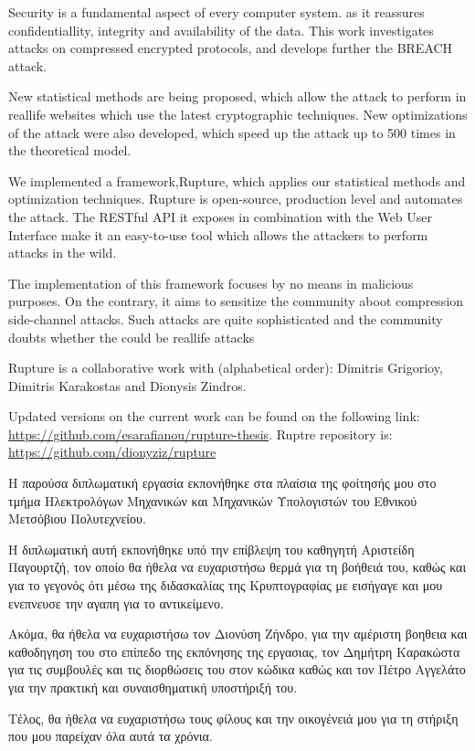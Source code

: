 \begin{abstracten}

Security is a fundamental aspect of every computer system. as it reassures
 confidentiallity, integrity and availability of the data. This work investigates
attacks on compressed encrypted protocols, and develops further the BREACH attack.

New statistical methods are being proposed, which allow the attack to perform in reallife websites
which use the latest cryptographic techniques. New optimizations of the attack were also developed, which speed
up the attack up to 500 times in the theoretical model.

We implemented a framework,Rupture, which applies our statistical methods and 
optimization techniques. Rupture is open-source, production level and automates the attack.
The RESTful API it exposes in combination with the Web User Interface make it an easy-to-use tool 
which allows the attackers to perform attacks in the wild.

The implementation of this framework focuses by no means in malicious purposes. On the contrary,
it aims to sensitize the community aboot compression side-channel attacks. Such attacks are quite 
sophisticated and the community doubts whether the could be reallife attacks

Rupture is a collaborative work with (alphabetical order): Dimitris Grigorioy, Dimitris Karakostas
and Dionysis Zindros.

Updated versions on the current work can be found on the following link:
\url{https://github.com/esarafianou/rupture-thesis}. Ruptre repository is:
\url{https://github.com/dionyziz/rupture}

\end{abstracten}

\begin{acknowledgementsgr}
Η παρούσα διπλωματική εργασία εκπονήθηκε στα πλαίσια της φοίτησής μου στο τμήμα
Ηλεκτρολόγων Μηχανικών και Μηχανικών Υπολογιστών του Εθνικού Μετσόβιου
Πολυτεχνείου.

Η διπλωματική αυτή εκπονήθηκε υπό την επίβλεψη του καθηγητή Αριστείδη Παγουρτζή,
τον οποίο θα ήθελα να ευχαριστήσω θερμά για τη βοήθειά του, καθώς και για το
γεγονός ότι μέσω της διδασκαλίας της Κρυπτογραφίας με εισήγαγε
και μου ενεπνευσε την αγαπη για το αντικείμενο.

Ακόμα, θα ήθελα να ευχαριστήσω τον Διονύση Ζήνδρο, για την αμέριστη βοηθεια και καθοδηγηση του
στο επίπεδο της εκπόνησης της εργασιας, τον Δημήτρη Καρακώστα για τις συμβουλές και
τις διορθώσεις του στον κώδικα καθώς και τον Πέτρο Αγγελάτο για την πρακτική και συναισθηματική υποστήριξή του.

Τέλος, θα ήθελα να ευχαριστήσω τους φίλους και την οικογένειά μου για τη στήριξη
που μου παρείχαν όλα αυτά τα χρόνια.

\end{acknowledgementsgr}
